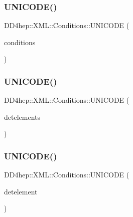 \subsubsection{\texorpdfstring{U\+N\+I\+C\+O\+D\+E()}{UNICODE()}\hspace{0.1cm}{\footnotesize\ttfamily [3/11]}}
{\footnotesize\ttfamily D\+D4hep\+::\+X\+M\+L\+::\+Conditions\+::\+U\+N\+I\+C\+O\+DE (\begin{DoxyParamCaption}\item[{conditions}]{ }\end{DoxyParamCaption})}

\hypertarget{namespace_d_d4hep_1_1_x_m_l_1_1_conditions_a02e5ebe727f41aef055c9ad425d0fe43}{}\label{namespace_d_d4hep_1_1_x_m_l_1_1_conditions_a02e5ebe727f41aef055c9ad425d0fe43} 
\subsubsection{\texorpdfstring{U\+N\+I\+C\+O\+D\+E()}{UNICODE()}\hspace{0.1cm}{\footnotesize\ttfamily [4/11]}}
{\footnotesize\ttfamily D\+D4hep\+::\+X\+M\+L\+::\+Conditions\+::\+U\+N\+I\+C\+O\+DE (\begin{DoxyParamCaption}\item[{detelements}]{ }\end{DoxyParamCaption})}

\hypertarget{namespace_d_d4hep_1_1_x_m_l_1_1_conditions_a05b5d8b1289036d694eee2c28a6997f8}{}\label{namespace_d_d4hep_1_1_x_m_l_1_1_conditions_a05b5d8b1289036d694eee2c28a6997f8} 
\subsubsection{\texorpdfstring{U\+N\+I\+C\+O\+D\+E()}{UNICODE()}\hspace{0.1cm}{\footnotesize\ttfamily [5/11]}}
{\footnotesize\ttfamily D\+D4hep\+::\+X\+M\+L\+::\+Conditions\+::\+U\+N\+I\+C\+O\+DE (\begin{DoxyParamCaption}\item[{detelement}]{ }\end{DoxyParamCaption})}

